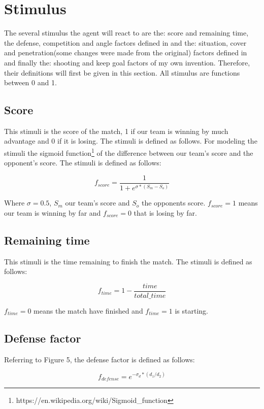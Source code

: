 \documentclass[
10pt, %
a4paper, %
oneside, %
headinclude,footinclude, %
BCOR5mm, %
]{scrartcl}
\begin{document}
\section{Stimulus}
The several stimulus the agent will react to are the: score and remaining time, the defense,
competition and angle factors defined in \cite{wu2004fuzzy}  and the: situation, cover and penetration(some changes were made from the original) factors defined in \cite{shi2015research} and finally the: shooting and keep goal factors of my own invention. Therefore, their definitions will first be given in this section. All stimulus are functions between 0 and 1.

\subsection{Score}
This stimuli is the score of the match, 1 if our team is winning by much advantage and 0 if it is losing. The stimuli is defined as follows. For modeling the stimuli the sigmoid function\footnote{https://en.wikipedia.org/wiki/Sigmoid\_function} of the difference between our team's score and the opponent's score. The stimuli is defined as follows:

\begin{equation}
	f_{score} = \frac{1}{1 + e^{\sigma * (S_m - S_o)}}
\end{equation}

Where $\sigma = 0.5$, $S_m$ our team's score and $S_o$ the opponents score. $f_{score} = 1$ means our team is winning by far and $f_{score} = 0$ that is losing by far.


\subsection{Remaining time}
This stimuli is the time remaining to finish the match. The stimuli is defined as follows:

\begin{equation}
	f_{time} = 1 - \frac{time}{total\_time}
\end{equation}

$f_{time} = 0$ means the match have finished and $f_{time} = 1$ is starting. 

\subsection{Defense factor}
Referring to Figure 5, the defense factor is defined as follows:

\begin{equation}
	f_{defense} = e^{-\sigma_d*(d_1/d_2)} 
\end{equation}
\end{document}
